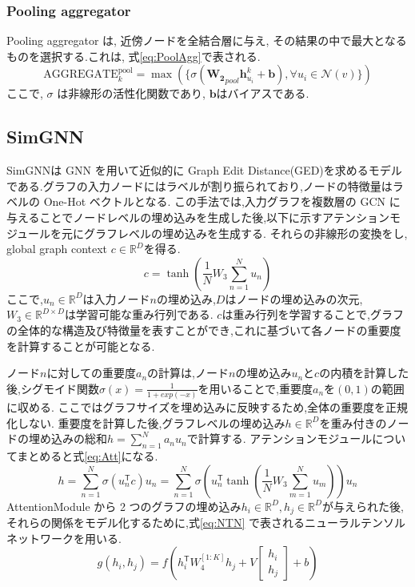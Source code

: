 \documentclass[a4j,twoside,12pt,dvipdfmx]{thesis} %
\begin{document}
\subsubsection{Pooling aggregator}
Pooling aggregator は, 近傍ノードを全結合層に与え, その結果の中で最大となるものを選択する.これは, 式\ref{eq:PoolAgg}で表される.
\begin{equation}
  \label{eq:PoolAgg}
  \mathrm{AGGREGATE}_{k}^{\mathrm{pool}} = \max(\{ \sigma ( \mathbf{W_{2}}_{pool} \mathbf{h}_{u_{i}}^{k} + \mathbf{b} ), \forall u_{i} \in \mathcal{N}(v) \})
\end{equation}
ここで, $\sigma$ は非線形の活性化関数であり, $\mathbf{b}$はバイアスである.

\subsection{SimGNN}
SimGNN\cite{bai2019simgnn}は GNN を用いて近似的に Graph Edit Distance(GED)を求めるモデルである.グラフの入力ノードにはラベルが割り振られており,ノードの特徴量はラベルの One-Hot ベクトルとなる.
この手法では,入力グラフを複数層の GCN に与えることでノードレベルの埋め込みを生成した後,以下に示すアテンションモジュールを元にグラフレベルの埋め込みを生成する.
それらの非線形の変換をし, global graph context $c \in \mathbb{R}^{D}$を得る.
\begin{equation}c = \tanh (\frac{1}{N}W_{3}{\displaystyle \sum_{n=1}^{N}} u_{n})\end{equation}
ここで,$u_{n} \in \mathbb{R}^{D}$は入力ノード$n$の埋め込み,$D$はノードの埋め込みの次元,$W_{3} \in \mathbb{R}^{D \times D}$は学習可能な重み行列である.
$c$は重み行列を学習することで,グラフの全体的な構造及び特徴量を表すことができ,これに基づいて各ノードの重要度を計算することが可能となる.\par
ノード$n$に対しての重要度$a_{n}$の計算は,ノード$n$の埋め込み$u_{n}$と$c$の内積を計算した後,シグモイド関数$\sigma(x) = \frac{1}{1+exp(-x)}$を用いることで,重要度$a_{n}$を$(0,1)$の範囲に収める.
ここではグラフサイズを埋め込みに反映するため,全体の重要度を正規化しない.
重要度を計算した後,グラフレベルの埋め込み$h \in \mathbb{R}^{D}$を重み付きのノードの埋め込みの総和$h = \sum_{n=1}^{N}a_{n}u_{n}$で計算する.
アテンションモジュールについてまとめると式\ref{eq:Att}になる.
\begin{equation}
  \label{eq:Att}
  h = \sum_{n=1}^{N}\sigma(u_{n}^\mathsf{T}c)u_{n}= \sum_{n=1}^{N}\sigma(u_{n}^\mathsf{T} \tanh (\frac{1}{N}W_{3}\sum_{m=1}^{N}u_{m}))u_{n}
\end{equation}
AttentionModule から 2 つのグラフの埋め込み$h_{i} \in \mathbb{R}^{D}, h_{j} \in \mathbb{R}^{D}$が与えられた後,
それらの関係をモデル化するために,式\ref{eq:NTN} で表されるニューラルテンソルネットワークを用いる.
\begin{equation}
  \label{eq:NTN}
  g(h_{i}, h_{j})=f(h_{i}^\mathsf{T}W_{4}^{[1:K]}h_{j} + V \begin{bmatrix} h_{i}\\h_{j} \end{bmatrix} + b)
\end{equation}
\end{document}
